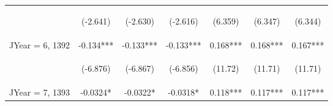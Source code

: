 \documentclass[]{article}
\begin{document}
\begin{center}
\begin{tabular}{lcccccc}
        \vspace{4pt}     & \begin{footnotesize}(-2.641)\end{footnotesize} & \begin{footnotesize}(-2.630)\end{footnotesize} & \begin{footnotesize}(-2.616)\end{footnotesize} & \begin{footnotesize}(6.359)\end{footnotesize}  & \begin{footnotesize}(6.347)\end{footnotesize}  & \begin{footnotesize}(6.344)\end{footnotesize}  \\
        JYear = 6, 1392  & -0.134***                                      & -0.133***                                      & -0.133***                                      & 0.168***                                       & 0.168***                                       & 0.167***                                       \\
        \vspace{4pt}     & \begin{footnotesize}(-6.876)\end{footnotesize} & \begin{footnotesize}(-6.867)\end{footnotesize} & \begin{footnotesize}(-6.856)\end{footnotesize} & \begin{footnotesize}(11.72)\end{footnotesize}  & \begin{footnotesize}(11.71)\end{footnotesize}  & \begin{footnotesize}(11.71)\end{footnotesize}  \\
        JYear = 7, 1393  & -0.0324*                                       & -0.0322*                                       & -0.0318*                                       & 0.118***                                       & 0.117***                                       & 0.117***                                       \\

\end{tabular}
\end{center}
\end{document}
